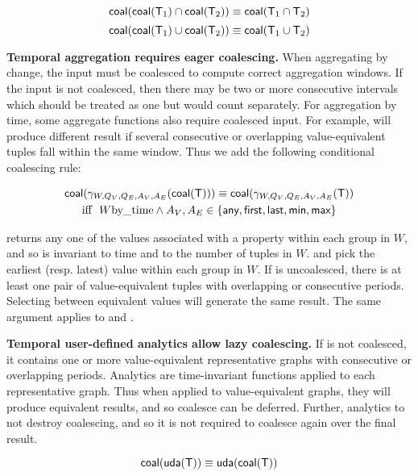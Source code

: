 \begin{equation}
\textsf{coal}(\textsf{coal}(\mathsf{T}_1) \cap \textsf{coal}(\mathsf{T}_2)) \equiv \textsf{coal}(\mathsf{T}_1 \cap \mathsf{T}_2)
\label{rul:intersect}
\end{equation}
\begin{equation}
\textsf{coal}(\textsf{coal}(\mathsf{T}_1) \cup \textsf{coal}(\mathsf{T}_2)) \equiv \textsf{coal}(\mathsf{T}_1 \cup \mathsf{T}_2)
\label{rul:union}
\end{equation}

{\bf Temporal aggregation requires eager coalescing.}  When
aggregating by change, the input must be coalesced to compute correct
aggregation windows.  If the input is not coalesced, then there may be
two or more consecutive intervals which should be treated as one but
would count separately. For aggregation by time, some aggregate
functions also require coalesced input.  For example, 
will produce different result if several consecutive or overlapping
value-equivalent tuples fall within the same window.  Thus we add the
following conditional coalescing rule:

\begin{multline}
\textsf{coal}(\gamma_{W,Q_V,Q_E,A_V,A_E}(\textsf{coal}(\mathsf{T}))) \equiv \textsf{coal}(\gamma_{W,Q_V,Q_E,A_V,A_E}(\mathsf{T})) \\
\text{iff}~~W \text{by\_time} \wedge A_V, A_E \in \{\textsf{any},\textsf{first}, \textsf{last},\textsf{min}, \textsf{max} \}
\label{rul:agg}
\end{multline}

 returns any one of the values associated with a property
within each group in $W$, and so is invariant to time and to the
number of tuples in $W$.   and  pick the
earliest (resp. latest) value within each group in $W$.  If \ttt is
uncoalesced, there is at least one pair of value-equivalent tuples
with overlapping or consecutive periods.  Selecting between equivalent
values will generate the same result.  The same argument applies to
 and .

{\bf Temporal user-defined analytics allow lazy coalescing.} If \trg
is not coalesced, it contains one or more value-equivalent
representative graphs with consecutive or overlapping periods.
Analytics are time-invariant functions applied to each representative
graph.  Thus when applied to value-equivalent graphs, they will
produce equivalent results, and so coalesce can be deferred.  Further,
analytics to not destroy coalescing, and so it is not required to
coalesce again over the final result.  

\begin{equation}
\textsf{coal}(\textsf{uda}(\mathsf{T})) \equiv \textsf{uda}(\textsf{coal}(\mathsf{T}))
\label{rul:analytic}
\end{equation}

